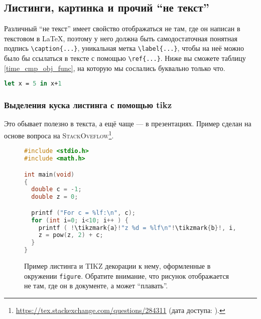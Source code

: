 \subsection{Листинги, картинка и прочий ``не текст''}

Различный ``не текст'' имеет свойство отображаться не там, где он написан в текстовом в \LaTeX{}, поэтому у него должна быть самодостаточ\-ная понятная подпись \verb=\caption{...}=, уникальная метка \verb=\label{...}=, чтобы на неё можно было бы ссылаться в тексте с помощью \verb=\ref{...}=. Ниже вы сможете таблицу \ref{time_cmp_obj_func}, на которую мы сослались буквально только что.


\begin{lstlisting}[caption={Название для листинга кода. Достаточно длинное, чтобы люди, которые смотрят картинку сразу после названия статьи (т.~е. все люди), смогли разобраться и понять к чему в статье листинги, картинки и прочий ``не текст''.}, language=Caml, frame=single]
  let x = 5 in x+1
\end{lstlisting}



\subsubsection{Выделения куска листинга с помощью tikz}
Это обывает полезно в текста, а ещё чаще --- в презентациях. Пример сделан на основе вопроса на \textsc{StackOveflow}\footnote{\url{https://tex.stackexchange.com/questions/284311} (дата доступа:   ).}.

\begin{figure}
\begin{lstlisting}[escapechar=!,basicstyle=\ttfamily, language=c]
#include <stdio.h>
#include <math.h>

int main(void)
{
  double c = -1;
  double z = 0;

  printf ("For c = %lf:\n", c);
  for (int i=0; i<10; i++ ) {
    printf ( !\tikzmark{a}!"z %d = %lf\n"!\tikzmark{b}!, i, z);
    z = pow(z, 2) + c;
  }
}
\end{lstlisting}

\caption{Пример листинга и \textsc{TIKZ} декорации к нему, оформленные в окружении \texttt{figure}. Обратите внимание, что рисунок отображается не там, где он в документе, а может ``плавать''.}
\end{figure}